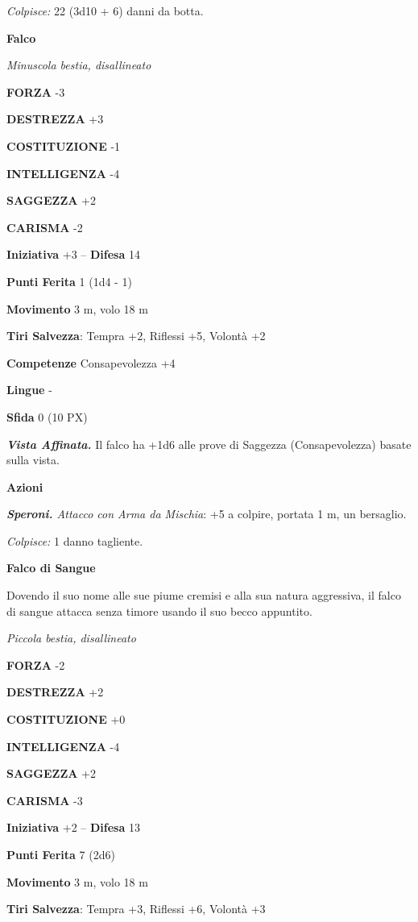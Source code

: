 \begin{multicols}{2}
\textit{Colpisce:} 22 (3d10 + 6) danni da botta.

\medskip\textbf{Falco}

\textit{Minuscola bestia, disallineato}

\textbf{FORZA} -3

\textbf{DESTREZZA} +3

\textbf{COSTITUZIONE} -1

\textbf{INTELLIGENZA} -4

\textbf{SAGGEZZA} +2

\textbf{CARISMA} -2

\textbf{Iniziativa} +3 -- \textbf{Difesa} 14

\textbf{Punti Ferita} 1 (1d4 - 1)

\textbf{Movimento} 3 m, volo 18 m

\textbf{Tiri Salvezza}: Tempra +2, Riflessi +5, Volontà +2

\textbf{Competenze} Consapevolezza +4

\textbf{Lingue} -

\textbf{Sfida} 0 (10 PX)

\textit{\textbf{Vista Affinata.}} Il falco ha +1d6 alle prove di Saggezza (Consapevolezza) basate sulla vista.

\textbf{Azioni}

\textit{\textbf{Speroni.} Attacco con Arma da Mischia}: +5 a colpire, portata 1 m, un bersaglio.

\textit{Colpisce:} 1 danno tagliente.

\medskip\textbf{Falco di Sangue}

Dovendo il suo nome alle sue piume cremisi e alla sua natura aggressiva, il falco di sangue attacca senza timore usando il suo becco appuntito.

\textit{Piccola bestia, disallineato}

\textbf{FORZA} -2

\textbf{DESTREZZA} +2

\textbf{COSTITUZIONE} +0

\textbf{INTELLIGENZA} -4

\textbf{SAGGEZZA} +2

\textbf{CARISMA} -3

\textbf{Iniziativa} +2 -- \textbf{Difesa} 13

\textbf{Punti Ferita} 7 (2d6)

\textbf{Movimento} 3 m, volo 18 m

\textbf{Tiri Salvezza}: Tempra +3, Riflessi +6, Volontà +3


\end{multicols}
